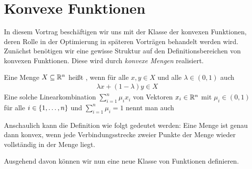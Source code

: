 \chapter{Konvexe Funktionen}


In diesem Vortrag beschäftigen wir uns mit der Klasse der konvexen Funktionen, deren Rolle in der Optimierung in späteren Vorträgen behandelt werden wird. \\
%
Zunächst benötigen wir eine gewisse Struktur auf den Definitionsbereichen von konvexen Funktionen. Diese wird durch \textit{konvexe Mengen} realisiert.

\begin{definition}
	Eine Menge $X \subseteq \mathbb{R}^n$ heißt , wenn für alle $x,y \in X$ und alle $\lambda \in (0,1)$ auch
	\begin{align} \label{eq: def_konvexkombination}
		\lambda x + (1 - \lambda) y \in X
	\end{align}
	Eine solche Linearkombination $\sum_{i=1}^{n} \mu_i x_i$ von Vektoren $x_i \in \mathbb{R}^n$ mit $\mu_i \in (0,1)$ für alle $i \in \left\{ 1,\dots,n \right\}$ und $\sum_{i=1}^n \mu_i = 1$ nennt man auch 
\end{definition}

Anschaulich kann die Definition wie folgt gedeutet werden:
Eine Menge ist genau dann konvex, wenn jede Verbindungsstrecke zweier Punkte der Menge wieder vollständig in der Menge liegt.


Ausgehend davon können wir nun eine neue Klasse von Funktionen definieren.

